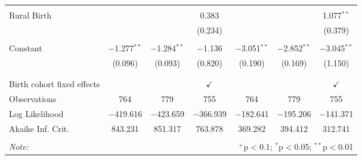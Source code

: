 \documentclass[12pt,letterpaper]{article}
\begin{document}
\begin{table}[!htbp]
\begin{tabular}{@{\extracolsep{5pt}}lcccccc}
		& & & & & & \\ 
		Rural Birth &  &  & 0.383 &  &  & 1.077$^{**}$ \\ 
		&  &  & (0.234) &  &  & (0.379) \\ 
		& & & & & & \\ 
		Constant & $-$1.277$^{**}$ & $-$1.284$^{**}$ & $-$1.136 & $-$3.051$^{**}$ & $-$2.852$^{**}$ & $-$3.045$^{**}$ \\ 
		& (0.096) & (0.093) & (0.820) & (0.190) & (0.169) & (1.150) \\ 
		& & & & & & \\ 
		\hline \\[-1.8ex] 
		Birth cohort fixed effects &  &  & $\checkmark$ &  &  & $\checkmark$ \\ 
		Observations & 764 & 779 & 755 & 764 & 779 & 755 \\ 
		Log Likelihood & $-$419.616 & $-$423.659 & $-$366.939 & $-$182.641 & $-$195.206 & $-$141.371 \\ 
		Akaike Inf. Crit. & 843.231 & 851.317 & 763.878 & 369.282 & 394.412 & 312.741 \\ 
		\hline 
		\hline \\[-1.8ex] 
		\textit{Note:}  & \multicolumn{6}{r}{$^{+}$p$<$0.1; $^{*}$p$<$0.05; $^{**}$p$<$0.01}} \\ 
\end{tabular} 
\end{table} 
\end{document}
